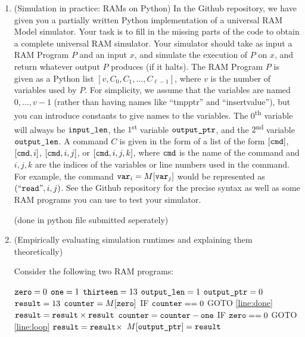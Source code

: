 \documentclass[11pt]{article}
\begin{document}
\begin{enumerate}
 
    \item (Simulation in practice: RAMs on Python)
    In the Github repository, we have given you a partially written Python implementation of a universal RAM Model simulator.  Your task is to fill in the missing parts of the code to obtain a complete universal RAM simulator.
     Your simulator should take as input a RAM Program $P$ and an input $x$, and simulate the execution of $P$ on $x$, and return whatever output $P$ produces (if it halts).  The RAM Program $P$ is given as a Python list $[v,C_0,C_1,\ldots,C_{\ell-1}]$, where $v$ is the number of variables used by $P$.  For simplicity, we assume that the variables are named $0,\ldots,v-1$ (rather than having names like ``tmpptr'' and ``insertvalue''), but you can introduce constants to give names to the variables.  The $0$\textsuperscript{th} variable will always be $\texttt{input\_len}$, the $1$\textsuperscript{st} variable $\texttt{output\_ptr}$, and the $2$\textsuperscript{nd} variable $\texttt{output\_len}$.  A command $C$ is given in the form of a list of the form $[\texttt{cmd}]$, $[\texttt{cmd},i]$, $[\texttt{cmd},i,j]$, or $[\texttt{cmd},i,j,k]$, where $\texttt{cmd}$ is the name of the command and $i,j,k$ are the indices of the variables or line numbers used in the command.  For example,  the command $\texttt{var}_i = M[\texttt{var}_j]$ would be represented as $(``\texttt{read}",i,j)$.  See the Github repository for the precise syntax as well as some RAM programs you can use to test your simulator.


     (done in python file submitted seperately) 

\item (Empirically evaluating simulation runtimes and explaining them theoretically)  

Consider the following two RAM programs:

\begin{algorithm}[H]
\setcounter{AlgoLine}{-1}
$\texttt{zero} = 0$\;
$\texttt{one} = 1$\;
$\texttt{thirteen} = 13$\;
$\texttt{output\_len} = 1$\;
$\texttt{output\_ptr} = 0$\;
$\texttt{result} = 13$\;
$\texttt{counter} = M[\texttt{zero}]$\;
\Indp
 IF $\texttt{counter} == 0$ GOTO \ref{line:done}\; \label{line:loop}
$\texttt{result} = \texttt{result} \times \texttt{result}$\;
$\texttt{counter} = \texttt{counter} - \texttt{one}$\;
IF $\texttt{zero} == 0$ GOTO \ref{line:loop}\;
\Indm
$\texttt{result} = \texttt{result} \times $\thirteen\; \label{line:done}
$M[\texttt{output\_ptr}]=\texttt{result}$\;
\end{algorithm}


\end{enumerate}
\end{document}
